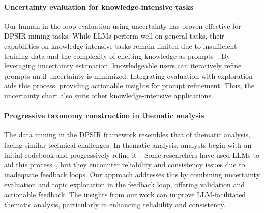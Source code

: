 \paragraph{Uncertainty evaluation for knowledge-intensive tasks}
Our human-in-the-loop evaluation using uncertainty has proven effective for DPSIR mining tasks. While LLMs perform well on general tasks, their capabilities on knowledge-intensive tasks remain limited due to insufficient training data and the complexity of eliciting knowledge as prompts~\cite{harvel2024llmknowledge}. By leveraging uncertainty estimation, knowledgeable users can iteratively refine prompts until uncertainty is minimized. 
Integrating evaluation with exploration aids this process, providing actionable insights for prompt refinement. Thus, the uncertainty chart also suits other knowledge-intensive applications.

\paragraph{Progressive taxonomy construction in thematic analysis}
The data mining in the DPSIR framework resembles that of thematic analysis, facing similar technical challenges. In thematic analysis, analysts begin with an initial codebook and progressively refine it~\cite{fereday2006thematic}. Some researchers have used LLMs to aid this process~\cite{dai2023llmintheloop, yan2024chatgptthematic}, but they encounter reliability and consistency issues due to inadequate feedback loops. Our approach addresses this by combining uncertainty evaluation and topic exploration in the feedback loop, offering validation and actionable feedback. The insights from our work can improve LLM-facilitated thematic analysis, particularly in enhancing reliability and consistency.

